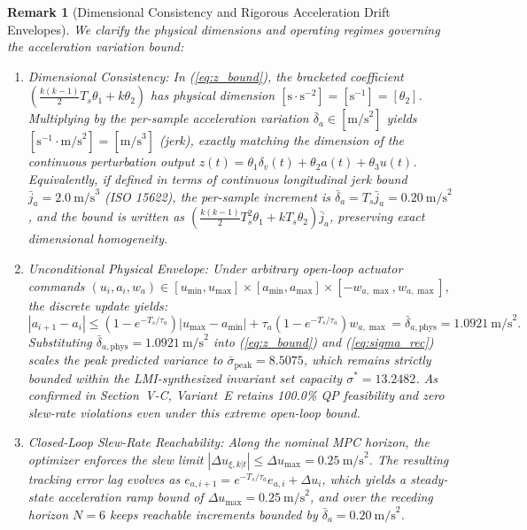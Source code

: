 \documentclass[journal]{IEEEtran}
\newtheorem{remark}{Remark}
\begin{document}
\begin{remark}[Dimensional Consistency and Rigorous Acceleration Drift Envelopes]
We clarify the physical dimensions and operating regimes governing the acceleration variation bound:
\begin{enumerate}
    \item \emph{Dimensional Consistency:} In (\ref{eq:z_bound}), the bracketed coefficient $\left(\frac{k(k-1)}{2} T_s \theta_1 + k \theta_2\right)$ has physical dimension $[\text{s} \cdot \text{s}^{-2}] = [\text{s}^{-1}] = [\theta_2]$. Multiplying by the per-sample acceleration variation $\bar\delta_a \in [\text{m/s}^2]$ yields $[\text{s}^{-1} \cdot \text{m/s}^2] = [\text{m/s}^3]$ (jerk), exactly matching the dimension of the continuous perturbation output $z(t) = \theta_1 \delta_v(t) + \theta_2 a(t) + \theta_3 u(t)$. Equivalently, if defined in terms of continuous longitudinal jerk bound $\bar j_a = 2.0~\text{m/s}^3$ (ISO 15622), the per-sample increment is $\bar\delta_a = T_s \bar j_a = 0.20~\text{m/s}^2$, and the bound is written as $\left(\frac{k(k-1)}{2} T_s^2 \theta_1 + k T_s \theta_2\right) \bar j_a$, preserving exact dimensional homogeneity.
    \item \emph{Unconditional Physical Envelope:} Under arbitrary open-loop actuator commands $(u_i, a_i, w_a) \in [u_{\min}, u_{\max}] \times [a_{\min}, a_{\max}] \times [-w_{a,\max}, w_{a,\max}]$, the discrete update yields:
    \begin{equation}
    |a_{i+1} - a_i| \le (1 - e^{-T_s/\tau_a}) |u_{\max} - a_{\min}| + \tau_a(1 - e^{-T_s/\tau_a}) w_{a,\max} = \bar\delta_{a,\mathrm{phys}} = 1.0921~\text{m/s}^2.
    \end{equation}
    Substituting $\bar\delta_{a,\mathrm{phys}} = 1.0921~\text{m/s}^2$ into (\ref{eq:z_bound}) and (\ref{eq:sigma_rec}) scales the peak predicted variance to $\bar\sigma_{\mathrm{peak}} = 8.5075$, which remains strictly bounded within the LMI-synthesized invariant set capacity $\sigma^* = 13.2482$. As confirmed in Section~V-C, Variant~E retains 100.0\% QP feasibility and zero slew-rate violations even under this extreme open-loop bound.
    \item \emph{Closed-Loop Slew-Rate Reachability:} Along the nominal MPC horizon, the optimizer enforces the slew limit $|\Delta u_{\xi,k|t}| \le \Delta u_{\max} = 0.25~\text{m/s}^2$. The resulting tracking error lag evolves as $e_{a,i+1} = e^{-T_s/\tau_a} e_{a,i} + \Delta u_i$, which yields a steady-state acceleration ramp bound of $\Delta u_{\max} = 0.25~\text{m/s}^2$, and over the receding horizon $N = 6$ keeps reachable increments bounded by $\bar\delta_a = 0.20~\text{m/s}^2$.
\end{enumerate}
\end{remark}
\end{document}
